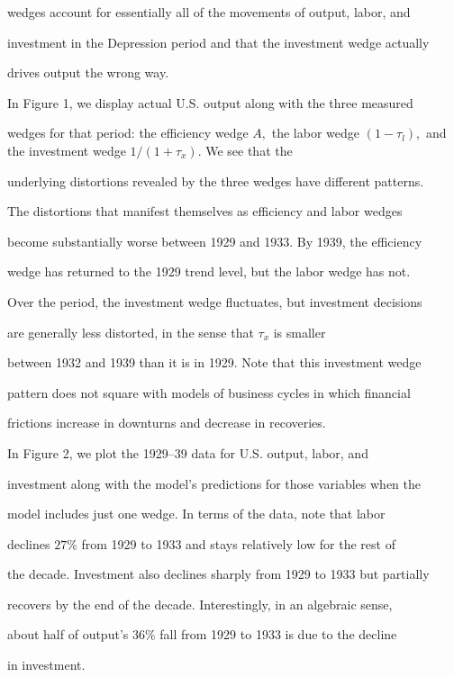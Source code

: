 \documentclass[fleqn,leqno,11pt]{article}
\begin{document}
wedges account for essentially all of the movements of output, labor, and

investment in the Depression period and that the investment wedge actually

drives output the wrong way.



In Figure 1, we display actual U.S. output along with the three measured

wedges for that period: the efficiency wedge $A,$ the labor wedge $(1-\tau

_{l}),$ and the investment wedge $1/(1+\tau _{x})$. We see that the

underlying distortions revealed by the three wedges have different patterns.

The distortions that manifest themselves as efficiency and labor wedges

become substantially worse between 1929 and 1933. By 1939, the efficiency

wedge has returned to the 1929 trend level, but the labor wedge has not.

Over the period, the investment wedge fluctuates, but investment decisions

are generally less distorted, in the sense that $\tau _{x}$ is smaller

between 1932 and 1939 than it is in 1929. Note that this investment wedge

pattern does not square with models of business cycles in which financial

frictions increase in downturns and decrease in recoveries.



In Figure 2, we plot the 1929--39 data for U.S. output, labor, and

investment along with the model's predictions for those variables when the

model includes just one wedge. In terms of the data, note that labor

declines $27\%$ from 1929 to 1933 and stays relatively low for the rest of

the decade. Investment also declines sharply from 1929 to 1933 but partially

recovers by the end of the decade. Interestingly, in an algebraic sense,

about half of output's $36\%$ fall from 1929 to 1933 is due to the decline

in investment.
\end{document}
